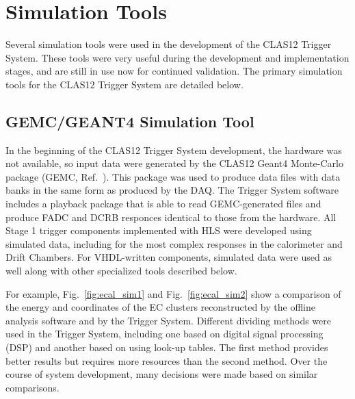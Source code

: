 \section{Simulation Tools}

Several simulation tools were used in the development of the CLAS12 Trigger System. These tools were very useful during the development and implementation stages, and are still in use now for continued validation. The primary simulation tools for the CLAS12 Trigger System are detailed below.


\subsection{GEMC/GEANT4 Simulation Tool}

In the beginning of the CLAS12 Trigger System development, the hardware was not available, so input data were generated by the CLAS12 Geant4 Monte-Carlo package (GEMC, Ref.~\cite{gemc-ref}). This package was used to produce data files with data banks in the same form as produced by the DAQ. The Trigger System software includes a playback package that is able to read GEMC-generated files and produce FADC and DCRB responces identical to those from the hardware. All Stage 1 trigger components implemented with HLS were developed using simulated data, including for the most complex responses in the calorimeter and Drift Chambers. For VHDL-written components, simulated data were used as well along with other specialized tools described below.

For example, Fig.~\ref{fig:ecal_sim1} and Fig.~\ref{fig:ecal_sim2} show a comparison of the energy and coordinates of the EC clusters reconstructed by the offline analysis software and by the Trigger System. Different dividing methods were used in the Trigger System, including one based on digital signal processing (DSP) and another based on using look-up tables. The first method provides better results but requires more resources than the second method. Over the course of system development, many decisions were made based on similar comparisons.

